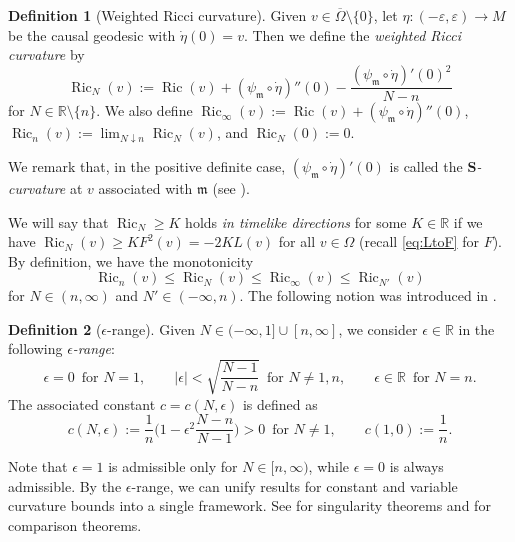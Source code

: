 \documentclass[a4paper,11pt]{article}
\numberwithin{equation}{section}
\theoremstyle{definition}
\newtheorem{definition}{Definition}[section]
\theoremstyle{plain}
\newcommand{\ve}{\varepsilon}
\newcommand{\ez}{\epsilon}
\newcommand{\lra}{\longrightarrow}
\newcommand{\R}{\ensuremath{\mathbb{R}}}
\newcommand{\fm}{\ensuremath{\mathfrak{m}}}
\def\Ric{\mathop{\mathrm{Ric}}\nolimits}
\begin{document}
\begin{definition}[Weighted Ricci curvature]\label{df:wRic}
Given $v \in \overline{\Omega} \setminus \{0\}$,
let $\eta\colon (-\ve,\ve) \lra M$ be the causal geodesic with $\dot{\eta}(0)=v$.
Then we define the \emph{weighted Ricci curvature} by
\begin{equation*}
\Ric_N(v) :=\Ric(v) +(\psi_\fm \circ \dot{\eta})''(0) -\frac{(\psi_\fm \circ \dot{\eta})'(0)^2}{N-n}
\end{equation*}
for $N \in \R \setminus \{n\}$.
We also define $\Ric_{\infty}(v) :=\Ric(v) +(\psi_\fm \circ \dot{\eta})''(0)$,
$\Ric_n(v) :=\lim_{N \downarrow n} \Ric_N(v)$, and $\Ric_N(0):=0$.
\end{definition}

We remark that, in the positive definite case, $(\psi_\fm \circ \dot{\eta})'(0)$ is called the \emph{$\mathbf{S}$-curvature} at $v$ associated with $\fm$ (see \cite{Obook,Shlec}).

We will say that $\Ric_N \ge K$ holds \emph{in timelike directions} for some $K \in \R$
if we have $\Ric_N(v) \ge KF^2(v) =-2KL(v)$ for all $v \in \Omega$ (recall \eqref{eq:LtoF} for $F$).
By definition, we have the monotonicity
\[ \Ric_n(v) \le \Ric_N(v) \le \Ric_{\infty}(v) \le \Ric_{N'}(v) \]
for $N \in (n,\infty)$ and $N' \in (-\infty,n)$.
The following notion was introduced in \cite{LMO1}.

\begin{definition}[$\ez$-range]\label{df:eran}
Given $N \in (-\infty,1] \cup [n,\infty]$, we consider $\ez \in \R$ in the following
\emph{$\ez$-range}:
\begin{equation}\label{eq:erange}
\epsilon=0 \,\text{ for } N=1, \qquad
 |\epsilon| < \sqrt{\frac{N-1}{N-n}} \,\text{ for } N \neq 1,n, \qquad
 \ez \in \R \,\text{ for } N=n.
\end{equation}
The associated constant $c =c(N,\ez)$ is defined as
\begin{equation}\label{eq:c}
c(N,\ez):= \frac{1}{n}\bigg( 1-\ez^2\frac{N-n}{N-1} \bigg) >0 \,\text{ for } N \neq 1, \qquad
 c(1,0):= \frac{1}{n}.
\end{equation}
\end{definition}

Note that $\ez=1$ is admissible only for $N \in [n,\infty)$, while $\ez=0$ is always admissible.
By the $\ez$-range, we can unify results for constant and variable curvature bounds
into a single framework.
See \cite{LMO1} for singularity theorems and \cite{LMO2} for comparison theorems.
\end{document}
